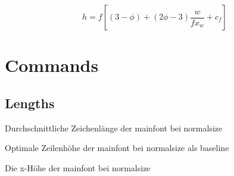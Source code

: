 \documentclass[a4paper,10pt]{scrarticle}
\begin{document}
\begin{equation}
h = f \left[ (3-\phi) + (2\phi-3) \frac{w}{fx_{w}} + c_{f} \right]
\end{equation}
\section{Commands}

\subsection{Lengths}

\noindent{} Durchschnittliche Zeichenlänge der mainfont bei normalsize

\noindent{} Optimale Zeilenhöhe der mainfont bei normalsize als baseline

\noindent{} Die x-Höhe der mainfont bei normalsize 
\end{document}
